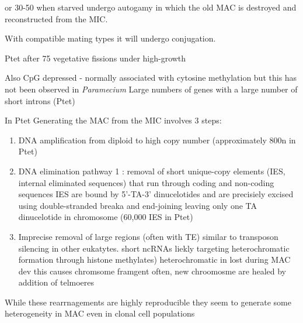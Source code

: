 \citep{Sung2012} or 30-50 when starved \citep{Berger1986} undergo autogamy in which
the old MAC is destroyed and reconstructed from the MIC. 

With compatible mating types it will undergo conjugation.




Ptet after 75 vegetative fissions under high-growth \citep{Sung2012}


Also CpG depressed - normally associated with cytosine methylation but this has not been observed in \textit{Paramecium}
Large numbers of genes with a large number of short introns (Ptet) \citep{Aury2006}




In Ptet
Generating the MAC from the MIC involves 3 steps:
\begin{enumerate}
    \item DNA amplification from diploid to high copy number (approximately 800n in Ptet)
    \item DNA elimination pathway 1 : removal of short unique-copy elements (IES, internal eliminated sequences) that run through coding and non-coding sequences
        IES are bound by 5'-TA-3' dinucelotides and are precisiely excised using
        double-stranded breaka and end-joining leaving only one TA dinucelotide in chromosome (60,000 IES in Ptet)
    \item Imprecise removal of large regions (often with TE) similar to transposon silencing in other eukatytes.
        short ncRNAs liekly targeting heterochromatic formation through histone methylates) heterochromatic in lost during MAC dev
        this causes chromsome framgent often, new chroomosme are healed by addition of telmoeres
\end{enumerate}

While these rearrnagements are highly reproducible they seem to generate some heterogeneity in MAC even in clonal cell populations





